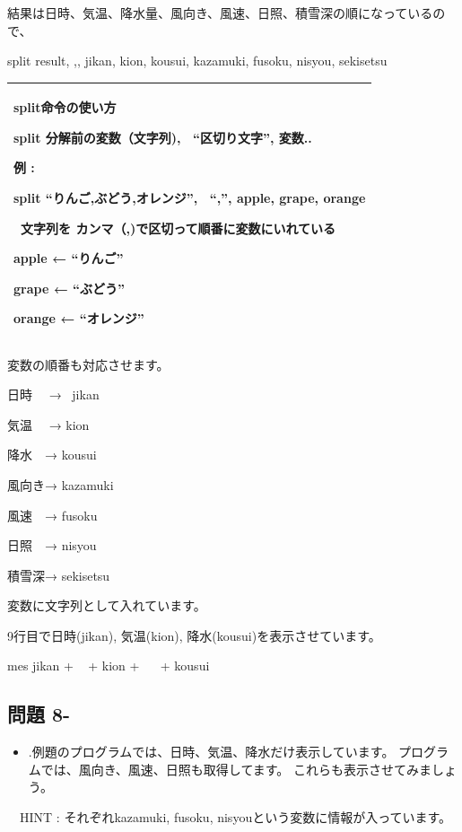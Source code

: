 \documentclass[a4paper,12pt,dvipdfmx]{jarticle}
\newcounter{Question}
\renewcommand\theQuestion{\textbf{問題 8-\arabic{Question}}}
\begin{document}
結果は日時、気温、降水量、風向き、風速、日照、積雪深の順になっているので、

split result, {\textquotedbl},{\textquotedbl}, jikan, kion, kousui, kazamuki, fusoku, nisyou, sekisetsu


\bigskip

\begin{center}
\tablefirsthead{}
\tablehead{}
\tabletail{}
\tablelasttail{}
\begin{supertabular}{|m{16.806cm}|}
\hline
split命令の使い方

split 分解前の変数（文字列), \ “区切り文字”,
変数..

例 : 

split “りんご,ぶどう,オレンジ”, \ “,”, apple, grape, orange

\ 文字列を
カンマ（,)で区切って順番に変数にいれている

apple ← “りんご”

grape ← “ぶどう”

orange ← “オレンジ”\\\hline
\end{supertabular}
\end{center}

\bigskip


\bigskip

変数の順番も対応させます。

日時 　→ \ jikan

気温　 → kion 　

降水　→ kousui 

風向き→ kazamuki

風速　→ fusoku

日照　→ nisyou

積雪深→ sekisetsu

変数に文字列として入れています。


\bigskip

9行目で日時(jikan), 気温(kion),
降水(kousui)を表示させています。

mes jikan + {\textquotedbl} \ {\textquotedbl} + kion + {\textquotedbl} \ \ {\textquotedbl} + kousui

\clearpage\subsection*{\theQuestion}
\begin{itemize}
\item
.例題のプログラムでは、日時、気温、降水だけ表示しています。
		プログラムでは、風向き、風速、日照も取得してます。
		これらも表示させてみましょう。
\end{itemize}
\ \ HINT : それぞれkazamuki, fusoku,
nisyouという変数に情報が入っています。
\end{document}
